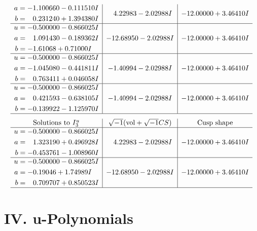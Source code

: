 \documentclass[1p]{elsarticle_modified}
\theoremstyle{definition}
\newcommand{\I}{\sqrt{-1}}
\begin{document}
$$\begin{array}{c|c|c}
\begin{aligned}
a &= -1.100660 - 0.111510 I \\
b &= \phantom{-}0.231240 + 1.394380 I\end{aligned}
 & \phantom{-}4.22983 - 2.02988 I & -12.00000 + 3.46410 I \\ \hline\begin{aligned}
u &= -0.500000 - 0.866025 I \\
a &= \phantom{-}1.091430 - 0.189362 I \\
b &= -1.61068 + 0.71000 I\end{aligned}
 & -12.68950 - 2.02988 I & -12.00000 + 3.46410 I \\ \hline\begin{aligned}
u &= -0.500000 - 0.866025 I \\
a &= -1.045080 - 0.441811 I \\
b &= \phantom{-}0.763411 + 0.046058 I\end{aligned}
 & -1.40994 - 2.02988 I & -12.00000 + 3.46410 I \\ \hline\begin{aligned}
u &= -0.500000 - 0.866025 I \\
a &= \phantom{-}0.421593 - 0.638105 I \\
b &= -0.139922 - 1.125970 I\end{aligned}
 & -1.40994 - 2.02988 I & -12.00000 + 3.46410 I\\
 \hline 
 \end{array}$$\newpage$$\begin{array}{c|c|c}  
\text{Solutions to }I^u_{3}& \I (\text{vol} + \sqrt{-1}CS) & \text{Cusp shape}\\
 \hline 
\begin{aligned}
u &= -0.500000 - 0.866025 I \\
a &= \phantom{-}1.323190 + 0.496928 I \\
b &= -0.453761 - 1.008960 I\end{aligned}
 & \phantom{-}4.22983 - 2.02988 I & -12.00000 + 3.46410 I \\ \hline\begin{aligned}
u &= -0.500000 - 0.866025 I \\
a &= -0.19046 + 1.74989 I \\
b &= \phantom{-}0.709707 + 0.850523 I\end{aligned}
 & -12.68950 - 2.02988 I & -12.00000 + 3.46410 I\\
 \hline 
 \end{array}$$\newpage
\newpage\renewcommand{\arraystretch}{1}
\centering \section*{ IV. u-Polynomials}
\end{document}
